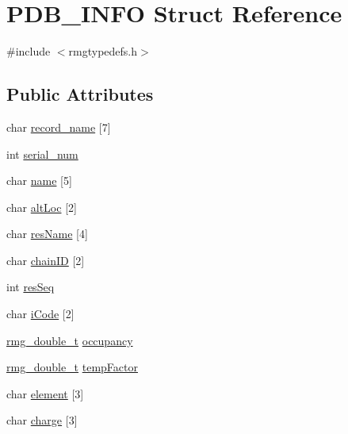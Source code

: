 \hypertarget{struct_p_d_b___i_n_f_o}{\section{P\-D\-B\-\_\-\-I\-N\-F\-O Struct Reference}
\label{struct_p_d_b___i_n_f_o}
}


{\ttfamily \#include $<$rmgtypedefs.\-h$>$}

\subsection*{Public Attributes}
\begin{DoxyCompactItemize}
\item 
char \hyperlink{struct_p_d_b___i_n_f_o_a384e31f95cc5b23e77b8e952091c8353}{record\-\_\-name} \mbox{[}7\mbox{]}
\item 
int \hyperlink{struct_p_d_b___i_n_f_o_adc6c71e1115a1ba128651d96bbc73b85}{serial\-\_\-num}
\item 
char \hyperlink{struct_p_d_b___i_n_f_o_aefbcb6c21742cd3ca7547072a38d728b}{name} \mbox{[}5\mbox{]}
\item 
char \hyperlink{struct_p_d_b___i_n_f_o_aa6e2a1bcb191da4a47abb0220d3d5495}{alt\-Loc} \mbox{[}2\mbox{]}
\item 
char \hyperlink{struct_p_d_b___i_n_f_o_a80d25ea64d311cc66f706705f3defe11}{res\-Name} \mbox{[}4\mbox{]}
\item 
char \hyperlink{struct_p_d_b___i_n_f_o_ac3c03f7d131843da7fce185b73ee5d8d}{chain\-I\-D} \mbox{[}2\mbox{]}
\item 
int \hyperlink{struct_p_d_b___i_n_f_o_a4ef9a86cf51ac541186e8e9662efb2a4}{res\-Seq}
\item 
char \hyperlink{struct_p_d_b___i_n_f_o_a95010d5a6d18406f09cb2e1f66134ead}{i\-Code} \mbox{[}2\mbox{]}
\item 
\hyperlink{rmgtypes_8h_aaa16921c14f121c56eaa42390a340db8}{rmg\-\_\-double\-\_\-t} \hyperlink{struct_p_d_b___i_n_f_o_a0bd4f661607dee09edc94c7cd0018c7c}{occupancy}
\item 
\hyperlink{rmgtypes_8h_aaa16921c14f121c56eaa42390a340db8}{rmg\-\_\-double\-\_\-t} \hyperlink{struct_p_d_b___i_n_f_o_a68569dce5b25d6bcf637f7506430f8da}{temp\-Factor}
\item 
char \hyperlink{struct_p_d_b___i_n_f_o_a76a5f6c1f8c95f001c8724948a7d4711}{element} \mbox{[}3\mbox{]}
\item 
char \hyperlink{struct_p_d_b___i_n_f_o_a071b12c5f401b4d4328480c92f3e8757}{charge} \mbox{[}3\mbox{]}
\end{DoxyCompactItemize}



